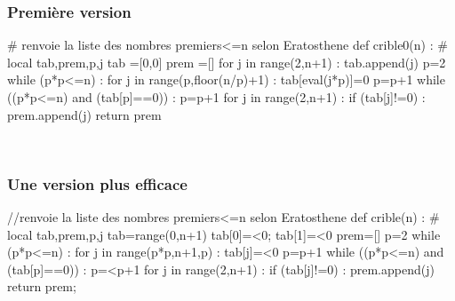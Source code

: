 \documentclass[12pt,a4paper]{book}
\begin{document}
\begin{giacjshere}
\subsubsection{Premi\`ere version}
\begin{giacprog}
# renvoie la liste des nombres premiers<=n selon Eratosthene
def crible0(n) :
    # local tab,prem,p,j
    tab =[0,0]
    prem =[]
    for j in  range(2,n+1) :
        tab.append(j)
    p=2
    while (p*p<=n) :
        for j in range(p,floor(n/p)+1) :
            tab[eval(j*p)]=0 
        p=p+1
        while ((p*p<=n) and (tab[p]==0)) :
            p=p+1
    for j in range(2,n+1) :
        if (tab[j]!=0) : 
            prem.append(j)
    return prem
\end{giacprog}
\\
\subsubsection{Une version plus efficace}
\begin{giacprog}
//renvoie la liste des nombres premiers<=n selon Eratosthene
def crible(n) :
    # local tab,prem,p,j
    tab=range(0,n+1)
    tab[0]=<0; tab[1]=<0 
    prem=[]
    p=2
    while (p*p<=n) :
        for j in range(p*p,n+1,p) :
            tab[j]=<0
        p=p+1
        while ((p*p<=n) and (tab[p]==0)) :
            p=<p+1
    for j in range(2,n+1) :
        if (tab[j]!=0) :
            prem.append(j)
    return prem;
\end{giacprog}
\\


\end{giacjshere}
\end{document}
